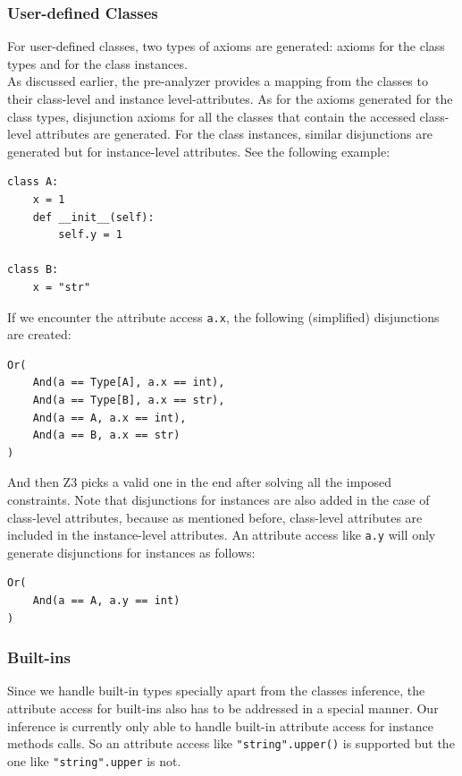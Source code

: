 \subsubsection{User-defined Classes}
For user-defined classes, two types of axioms are generated: axioms for the class types and for the class instances. \\

As discussed earlier, the pre-analyzer provides a mapping from the classes to their class-level and instance level-attributes.
As for the axioms generated for the class types, disjunction axioms for all the classes that contain the accessed class-level attributes are generated. For the class instances, similar disjunctions are generated but for instance-level attributes. See the following example:
\begin{lstlisting}
class A:
	x = 1
	def __init__(self):
		self.y = 1

class B:
	x = "str"
\end{lstlisting}

If we encounter the attribute access \lstinline|a.x|, the following (simplified) disjunctions are created:
\begin{lstlisting}
Or(
	And(a == Type[A], a.x == int),
	And(a == Type[B], a.x == str),
	And(a == A, a.x == int),
	And(a == B, a.x == str)
)
\end{lstlisting}

And then Z3 picks a valid one in the end after solving all the imposed constraints. Note that disjunctions for instances are also added in the case of class-level attributes, because as mentioned before, class-level attributes are included in the instance-level attributes. An attribute access like \lstinline|a.y| will only generate disjunctions for instances as follows:
\begin{lstlisting}
Or(
	And(a == A, a.y == int)
)
\end{lstlisting}
\subsubsection{Built-ins}
Since we handle built-in types specially apart from the classes inference, the attribute access for built-ins also has to be addressed in a special manner. Our inference is currently only able to handle built-in attribute access for instance methods calls. So an attribute access like \lstinline|"string".upper()| is supported but the one like \lstinline|"string".upper| is not. \\

